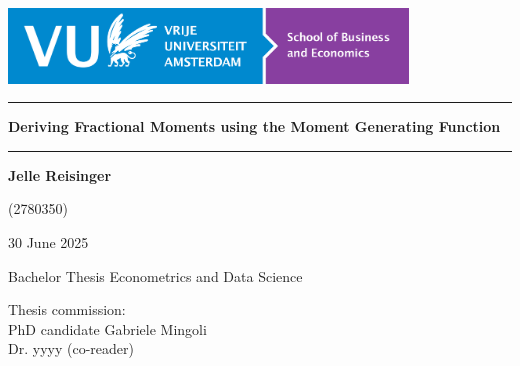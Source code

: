 \documentclass[a4paper,11pt]{article}
\theoremstyle{plain}
\numberwithin{theorem}{subsection}
\numberwithin{corollary}{subsection}
\numberwithin{proposition}{subsection}
\numberwithin{lemma}{subsection}
\numberwithin{assumption}{subsection}
\theoremstyle{definition}
\numberwithin{definition}{subsection}
\numberwithin{example}{subsection}
\numberwithin{remark}{subsection}
\numberwithin{notation}{subsection}
\begin{document}

\thispagestyle{empty}

\includegraphics[height=2cm]{figures/LogoSBE.png}

\vspace*{3cm}

\noindent
\rule{\textwidth}{0.8pt}
\begin{center}
{\huge\bf
\noindent
Deriving Fractional Moments using the Moment Generating Function
}
\end{center}

\vspace*{-8pt}
\noindent
\rule{\textwidth}{0.8pt}

\vspace*{2cm}

\begin{center}
{\LARGE\bf
Jelle Reisinger
}

{\Large
\vspace*{0.5cm}
(2780350)


\vspace*{2cm}

30 June 2025
}
\end{center}

\vspace*{2cm}

{\Large
\noindent
Bachelor Thesis Econometrics and Data Science
}

\vspace*{1cm}

{\Large
\noindent
Thesis commission:\\[0.3cm]
PhD candidate Gabriele Mingoli\\[0.3cm]
Dr. yyyy (co-reader)
}


\newpage

\setcounter{page}{1}












\end{document}
